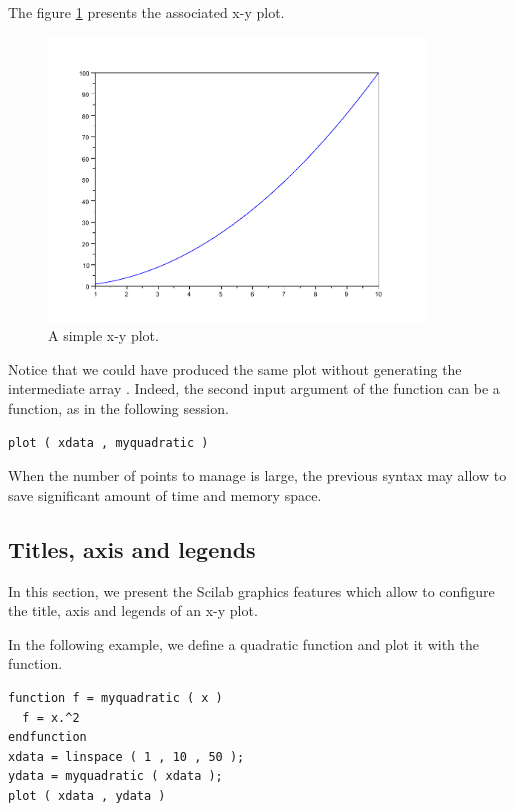 The figure \ref{fig-introoptim-xyplot} presents the 
associated x-y plot.

\begin{figure}
\begin{center}
\includegraphics[width=10cm]{introscilab/xyplot.pdf}
\end{center}
\caption{A simple x-y plot.}
\label{fig-introoptim-xyplot}
\end{figure}

Notice that we could have produced the same plot without 
generating the intermediate array .
Indeed, the second input argument of the  function can
be a function, as in the following session.
\lstset{language=scilabscript}
\begin{lstlisting}
plot ( xdata , myquadratic )
\end{lstlisting}
When the number of points to manage is large, the previous syntax may
allow to save significant amount of time and memory space.

\subsection{Titles, axis and legends}

In this section, we present the Scilab graphics features
which allow to configure the title, axis and legends of 
an x-y plot. 

In the following example, we define a quadratic function and plot 
it with the  function.
\lstset{language=scilabscript}
\begin{lstlisting}
function f = myquadratic ( x )
  f = x.^2
endfunction
xdata = linspace ( 1 , 10 , 50 );
ydata = myquadratic ( xdata );
plot ( xdata , ydata )
\end{lstlisting}

